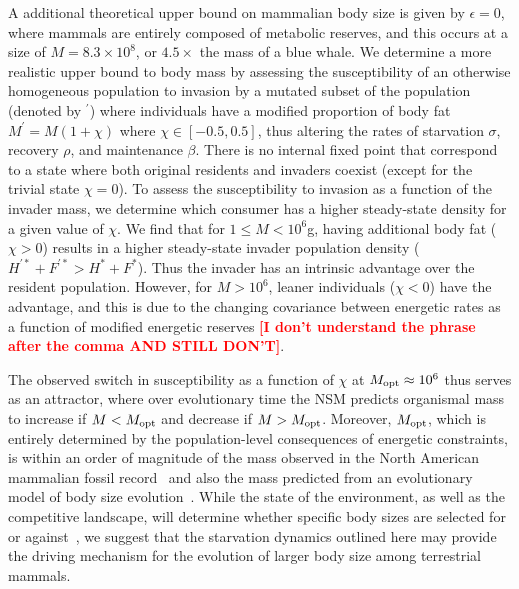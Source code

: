 \documentclass{pnastwo}
\newcommand{\sid}[1]{\textcolor{red}{\bf [#1]}}
\begin{document}
\begin{article}
A additional theoretical upper bound on mammalian body size is given by $\epsilon=0$, where mammals are entirely composed of metabolic reserves, and this occurs at a size of $M=8.3\times 10^8$, or $4.5\times$ the mass of a blue whale.
We determine a more realistic upper bound to body mass by assessing the
susceptibility of an otherwise homogeneous population to invasion by a
mutated subset of the population (denoted by ${}^\prime$) where individuals
have a modified proportion of body fat $M^\prime=M(1+\chi)$ where
$\chi \in [-0.5,0.5]$, thus altering the rates of starvation $\sigma$,
recovery $\rho$, and maintenance $\beta$.  There is no internal fixed point
that correspond to a state where both original residents and invaders coexist
(except for the trivial state $\chi=0$).  To assess the susceptibility to
invasion as a function of the invader mass, we determine which consumer has a
higher steady-state density for a given value of $\chi$.  We find that for
$1\leq M<10^6$g, having additional body fat ($\chi > 0$) results in a higher
steady-state invader population density
($H^{\prime *}+F^{\prime *}>H^*+F^*$).  Thus the invader has an intrinsic
advantage over the resident population.  However, for $M>10^6$, leaner
individuals ($\chi < 0$) have the advantage, and this is due to the changing
covariance between energetic rates as a function of modified energetic
reserves \sid{I don't understand the phrase after the comma AND STILL DON'T}.

The observed switch in susceptibility as a function of $\chi$ at
$M_{\rm opt}\approx10^6$ thus serves as an attractor, where over evolutionary
time the NSM predicts organismal mass to increase if $M<M_{\rm opt}$ and
decrease if $M>M_{\rm opt}$.  Moreover, $M_{\rm opt}$, which is entirely
determined by the population-level consequences of energetic constraints, is
within an order of magnitude of the mass observed in the North American
mammalian fossil record~\cite{Alroy:1998p1594} and also the mass predicted
from an evolutionary model of body size evolution~\cite{Clauset:2009fh}.
While the state of the environment, as well as the competitive landscape,
will determine whether specific body sizes are selected for or
against~\cite{Saarinen:2014br}, we suggest that the starvation dynamics
outlined here may provide the driving mechanism for the evolution of larger
body size among terrestrial mammals.



\end{article}
\end{document}
